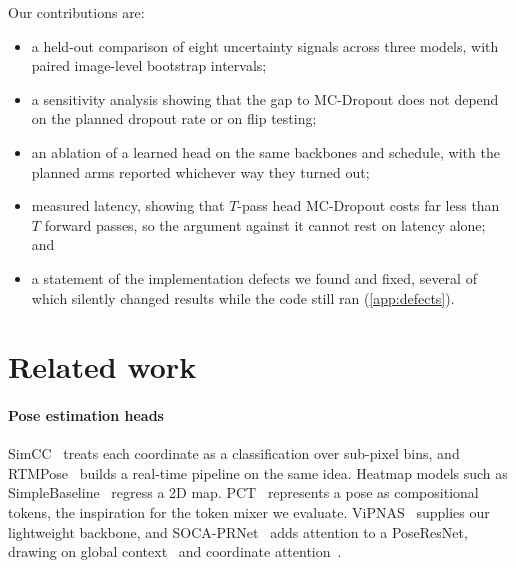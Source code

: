 \documentclass[preprint,11pt]{elsarticle}
\begin{document}
Our contributions are:
\begin{itemize}
\item a held-out comparison of eight uncertainty signals across three models, with paired
image-level bootstrap intervals;
\item a sensitivity analysis showing that the gap to MC-Dropout does not depend on the planned
dropout rate or on flip testing;
\item an ablation of a learned head on the same backbones and schedule, with the planned arms
reported whichever way they turned out;
\item measured latency, showing that $T$-pass head MC-Dropout costs far less than $T$ forward
passes, so the argument against it cannot rest on latency alone; and
\item a statement of the implementation defects we found and fixed, several of which silently
changed results while the code still ran (\ref{app:defects}).
\end{itemize}

\section{Related work}

\paragraph{Pose estimation heads} SimCC~\cite{li2022simcc} treats each coordinate as a
classification over sub-pixel bins, and RTMPose~\cite{jiang2023rtmpose} builds a real-time
pipeline on the same idea. Heatmap models such as SimpleBaseline~\cite{xiao2018simple} regress a
2D map. PCT~\cite{geng2023pct} represents a pose as compositional tokens, the inspiration for the
token mixer we evaluate. ViPNAS~\cite{xu2021vipnas} supplies our lightweight backbone, and
SOCA-PRNet~\cite{zakir2024soca} adds attention to a PoseResNet, drawing on global
context~\cite{cao2019gcnet} and coordinate attention~\cite{hou2021coordinate}.
\end{document}
